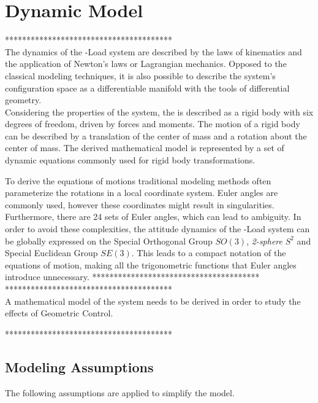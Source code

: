 \chapter{Dynamic Model} \label{ch:model}

***************************************\\

The dynamics of the -Load system are described by the laws of kinematics and the application of Newton's laws or Lagrangian mechanics. Opposed to the classical modeling techniques, it is also possible to describe the system's configuration space as a differentiable manifold with the tools of differential geometry. \\

Considering the properties of the system, the  is described as a rigid body with six degrees of freedom, driven by forces and moments. The motion of a rigid body can be described by a translation of the center of mass and a rotation about the center of mass. The derived mathematical model is represented by a set of dynamic equations commonly used for rigid body transformations. 

To derive the equations of motions traditional modeling methods often parameterize the rotations in a local coordinate system. Euler angles are commonly used, however these coordinates might result in singularities. Furthermore, there are 24 sets of Euler angles, which can lead to ambiguity. In order to avoid these complexities, the attitude dynamics of the -Load system can be globally expressed on the Special Orthogonal Group $SO(3)$, \textit{2-sphere} $ S^2 $ and Special Euclidean Group $ SE(3) $. This leads to a compact notation of the equations of motion, making all the trigonometric functions that Euler angles introduce unnecessary.
***************************************\\


***************************************\\
A mathematical model of the system needs to be derived in order to study the effects of Geometric Control. 

***************************************\\


\section{Modeling Assumptions} 
The following assumptions are applied to simplify the model.\\

